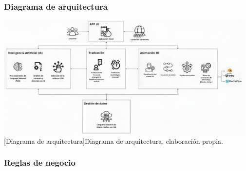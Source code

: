 \subsubsection{Diagrama de arquitectura}
\begin{center}
	\includegraphics[width=0.97\textwidth]{Images/Cap 3/Arquitectura_Grande.jpg}
	[Diagrama de arquitectura]{Diagrama de arquitectura, elaboración propia.}  %
\end{center}

\subsubsection{Reglas de negocio}

